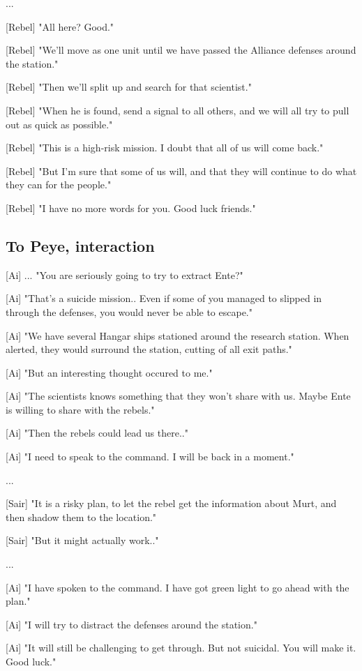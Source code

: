 \documentclass[a4paper,12pt]{article}
\begin{document}
...

[Rebel] "All here? Good." 

[Rebel] "We'll move as one unit until we have passed the Alliance defenses around the station."

[Rebel] "Then we'll split up and search for that scientist." 

[Rebel] "When he is found, send a signal to all others, and we will all try to pull out as quick as possible."

[Rebel] "This is a high-risk mission. I doubt that all of us will come back."

[Rebel] "But I'm sure that some of us will, and that they will continue to do what they can for the people."

[Rebel] "I have no more words for you. Good luck friends."

\subsection{To Peye, interaction}

[Ai] ... "You are seriously going to try to extract Ente?" 

[Ai] "That's a suicide mission.. Even if some of you managed to slipped in through
the defenses, you would never be able to escape." 

[Ai] "We have several Hangar ships stationed around the research station. When alerted, they would surround
the station, cutting of all exit paths."

[Ai] "But an interesting thought occured to me." 

[Ai] "The scientists knows something that they won't share with us. Maybe Ente is willing to share with the rebels."

[Ai] "Then the rebels could lead us there.."

[Ai] "I need to speak to the command. I will be back in a moment."

...

[Sair] "It is a risky plan, to let the rebel get the information about Murt, and then shadow them to
the location."

[Sair] "But it might actually work.."

...

[Ai] "I have spoken to the command. I have got green light to go ahead with the plan."

[Ai] "I will try to distract the defenses around the station."

[Ai] "It will still be challenging to get through. But not suicidal. You will make it. Good luck."
\end{document}
